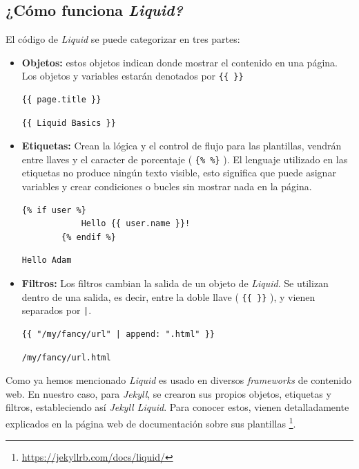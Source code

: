 \documentclass[a4paper, 12pt]{book}
\begin{document}
\subsection*{¿Cómo funciona \emph{Liquid?}} 
El código de  \emph{Liquid} se puede categorizar en tres partes:
\begin{itemize}
    \item \textbf{Objetos:} estos objetos indican donde mostrar el contenido en una página. Los objetos y variables estarán denotados por \texttt{\{\{ \}\}}
    \begin{lstlisting}[title=Código 1: Input. Objetos]
    {{ page.title }}
    \end{lstlisting}
    \begin{lstlisting}[title=Código 2: Output. Objetos]
    {{ Liquid Basics }}
    \end{lstlisting}
    \item \textbf{Etiquetas:} Crean la lógica y el control de flujo para las plantillas, vendrán entre llaves y el caracter de porcentaje ( \texttt{\{\%  \%\}} ). El lenguaje utilizado en las etiquetas no produce ningún texto visible, esto significa que puede asignar variables y crear condiciones o bucles sin mostrar nada en la página. 
    \begin{lstlisting}[title=Código 3: Input. Etiquetas]
        {% if user %}
            Hello {{ user.name }}!
        {% endif %}
    \end{lstlisting}
    \begin{lstlisting}[title=Código 4: Output. Etiquetas]
        Hello Adam
    \end{lstlisting}
    \item \textbf{Filtros:} Los filtros cambian la salida de un objeto de \emph{Liquid}. Se utilizan dentro de una salida, es decir, entre la doble llave ( \texttt{\{\{ \}\}} ), y vienen separados por \texttt{|}.     
    \begin{lstlisting}[title=Código 5: Input. Filtros]
    {{ "/my/fancy/url" | append: ".html" }}
    \end{lstlisting}
    \begin{lstlisting}[title=Código 6: Output. Filtros]
    /my/fancy/url.html
    \end{lstlisting}
\end{itemize}

Como ya hemos mencionado \emph{Liquid} es usado en diversos \emph{frameworks} de contenido web. En nuestro caso, para \emph{Jekyll}, se crearon sus propios objetos, etiquetas y filtros, estableciendo así \emph{Jekyll Liquid}. Para conocer estos, vienen detalladamente explicados  en la página web de  documentación sobre sus plantillas \footnote{\url{https://jekyllrb.com/docs/liquid/}}. 
       
\end{document}
